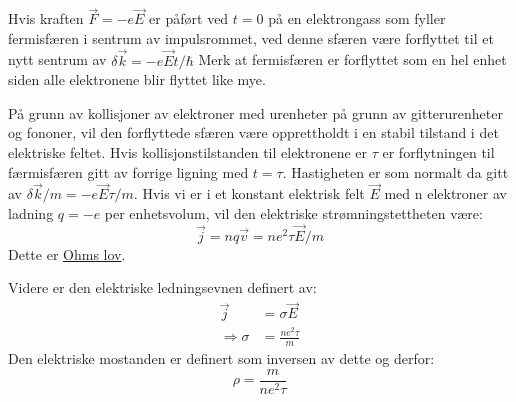 \documentclass{article}
\begin{document}
Hvis kraften $\vec{F} = -e \vec{E}$ er påført ved $t = 0$ på en elektrongass som fyller fermisfæren i sentrum av impulsrommet, ved denne sfæren være forflyttet til et nytt sentrum av $\delta \vec{k} = - e \vec{E} t / \hbar$
Merk at fermisfæren er forflyttet som en hel enhet siden alle elektronene blir flyttet like mye.

På grunn av kollisjoner av elektroner med urenheter på grunn av gitterurenheter og fononer, vil den forflyttede sfæren være opprettholdt i en stabil tilstand i det elektriske feltet. Hvis kollisjonstilstanden til elektronene er $\tau$ er forflytningen til færmisfæren gitt av forrige ligning med $t = \tau$. Hastigheten er som normalt da gitt av $\delta \vec{k}/ m = -e \vec{E} \tau / m $. Hvis vi er i et konstant elektrisk felt $\vec{E}$ med n elektroner av ladning $q = -e$ per enhetsvolum, vil den elektriske strømningstettheten være:
\begin{equation}
    \vec{j} = n q \vec{v} = n e^2 \tau \vec{E} / m
\end{equation}
Dette er \underline{Ohms lov}.

Videre er den elektriske ledningsevnen definert av:
\begin{align}
    \vec{j} &= \sigma \vec{E}\\
    \Rightarrow \sigma &= \frac{ n e^2 \tau}{m}
\end{align}
Den elektriske mostanden er definert som inversen av dette og derfor:
\begin{equation}
    \rho = \frac{m}{ne^2\tau}
\end{equation}
\end{document}
